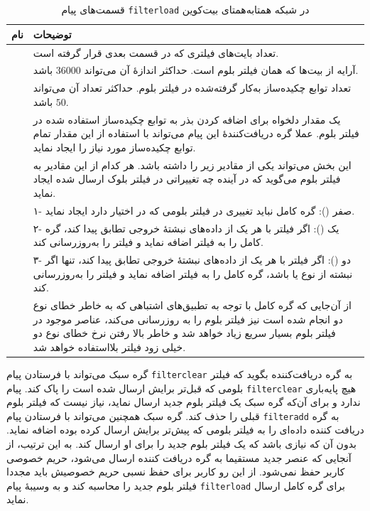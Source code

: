 \begin{xltabular}{\textwidth}{|c|X|}
	\caption{
		قسمت‌های پیام \texttt{filterload} در شبکه همتا‌به‌همتای بیت‌کوین
		\label{table:filterloadMessage}}\\
	\hline
	\textbf{نام} & {\textbf{توضیحات}} \\
	\hline \hline
	 &{%
تعداد بایت‌های فیلتری که در قسمت بعدی قرار گرفته است.	
}\\
\hline
	 &{%
	آر‌ایه از بیت‌ها که همان فیلتر بلوم است. حداکثر اندازهٔ آن می‌تواند $36000$ باشد.
}\\
\hline
	 &{%
	تعداد توابع چکیده‌ساز به‌کار گرفته‌شده در فیلتر بلوم. حداکثر تعداد آن می‌تواند $50$ باشد.
}\\
\hline
	 &{%
	یک مقدار دلخواه برای اضافه کردن بذر به توابع چکیده‌ساز استفاده شده در فیلتر بلوم. عملا گره دریافت‌کنندهٔ این پیام می‌تواند با استفاده از این مقدار تمام توابع چکیده‌ساز مورد نیاز را ایجاد نماید.
}\\
\hline
	 &{%
	این بخش می‌تواند یکی از مقادیر زیر را داشته باشد. هر کدام از این مقادیر به فیلتر بلوم می‌گوید که در آینده چه تغییراتی در فیلتر بلوک ارسال شده ایجاد نماید.
}\\
&{%
۱- صفر (): گره کامل نباید تغییری در فیلتر بلومی که در اختیار دارد ایجاد نماید.
}\\
&{%
۲- یک (): اگر فیلتر با هر یک از داده‌های نبشتهٔ خروجی تطابق پیدا کند، گره کامل  را به فیلتر اضافه نماید و فیلتر را به‌روزرسانی کند.
}\\
&{%
	۳- دو (): اگر فیلتر با هر یک از داده‌های نبشتهٔ خروجی تطابق پیدا کند، تنها اگر نبشته از نوع  یا  باشد، گره کامل  را به فیلتر اضافه نماید و فیلتر را به‌روزرسانی کند.
}\\
&{%
	از آن‌جایی که گره کامل با توجه به تطبیق‌های اشتباهی که به خاطر خطای نوع دو انجام شده است نیز فیلتر بلوم را به روزرسانی می‌کند، عناصر موجود در فیلتر بلوم بسیار سریع زیاد خواهد شد و خاطر بالا رفتن نرخ خطای نوع دو خیلی زود فیلتر بلااستفاده خواهد شد.
}\\
\hline
	
\end{xltabular}

گره سبک می‌تواند با فرستادن پیام \texttt{filterclear} به گره دریافت‌کننده بگوید که فیلتر بلومی که قبل‌تر برایش ارسال شده است را پاک کند. پیام \texttt{filterclear} هیچ پایه‌باری ندارد و برای آن‌که گره سبک یک فیلتر بلوم جدید ارسال نماید، نیاز نیست که فیلتر بلوم قبلی را حذف کند. گره سبک همچنین می‌تواند با فرستادن پیام \texttt{filteradd} به گره دریافت کننده داده‌ای را به فیلتر بلومی که پیش‌تر برایش ارسال کرده بوده اضافه نماید. بدون آن که نیازی باشد که یک فیلتر بلوم جدید را برای او ارسال کند. به ‌این ترتیب،‌ از آنجایی که عنصر جدید مستقیما به گره دریافت کننده ارسال می‌شود، حریم خصوصی کاربر حفظ نمی‌شود. از این رو کاربر برای حفظ نسبی حریم خصوصیش باید مجددا فیلتر بلوم جدید را محاسبه کند و به وسیبهٔ پیام \texttt{filterload} برای گره کامل ارسال نماید.

